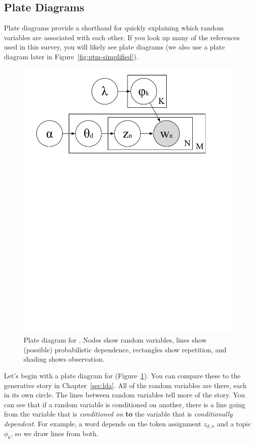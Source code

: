 \subsection{Plate Diagrams}
\label{sec:plate}

Plate diagrams provide a shorthand for quickly explaining which random
variables are associated with each other.  If you look up many of the
references used in this survey, you will likely see plate diagrams (we
also use a plate diagram later in Figure~\ref{fig:ptm-simplified}).  

\begin{figure}
  \begin{center}
  \includegraphics[width=0.7\linewidth]{figures/lda_plate}
  \end{center}
  \caption{Plate diagram for .  Nodes show random variables,
    lines show (possible) probabilistic dependence, rectangles show
    repetition, and shading shows observation.}
  \label{fig:plate-lda}
\end{figure}

Let's begin with a plate diagram for 
(Figure~\ref{fig:plate-lda}).  You can compare these to the generative
story in Chapter~\ref{sec:lda}.  All of the random variables are
there, each in its own circle.  The lines between random variables
tell more of the story.  You can see that if a random variable is
conditioned on another, there is a line going from the variable that
is \emph{conditioned on} {\bf to} the variable that is
\emph{conditionally dependent}.  For example, a word depends on the
token assignment $z_{d,n}$ and a topic $\phi_k$, so we draw lines
from both.

